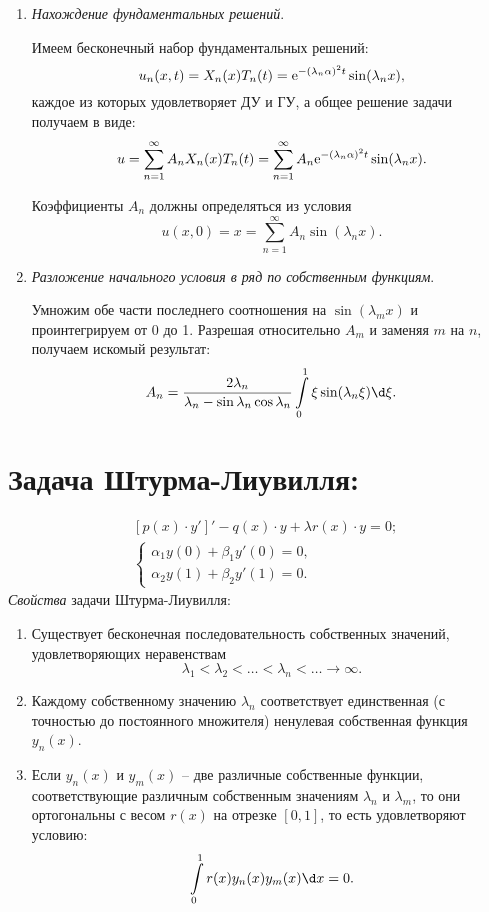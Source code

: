 \begin{enumerate}
    \item \emph{Нахождение фундаментальных решений}.
    
    Имеем бесконечный набор фундаментальных решений:
    \[
        u_n(x, t) = X_n(x)T_n(t) = \mathrm{e}^{-(\lambda_n\alpha)^2t}\sin(\lambda_nx),
    \]
    каждое из которых удовлетворяет ДУ и ГУ, а общее решение задачи получаем в
    виде:
    \[
        u = \sum\limits_{n=1}^\infty A_nX_n(x)T_n(t) = \sum\limits_{n=1}^\infty
        A_n\mathrm{e}^{-(\lambda_n\alpha)^2t}\sin(\lambda_nx).
    \]
    
    Коэффициенты \( A_n \) должны определяться из условия
    \[
        u(x, 0) = x = \sum\limits_{n=1}^\infty A_n\sin(\lambda_nx).
    \]
    
    \item \emph{Разложение начального условия в ряд по собственным функциям}.
    
    Умножим обе части последнего соотношения на \( \sin(\lambda_mx) \) и
    проинтегрируем от 0 до 1. Разрешая относительно \( A_m \) и заменяя \( m \)
    на \( n \), получаем искомый результат:
    \[
        A_n = \frac{2\lambda_n}{\lambda_n - \sin\lambda_n\cos\lambda_n}
        \int\limits_0^1 \xi\sin(\lambda_n\xi)\d\xi.
    \]
\end{enumerate}

\section{Задача Штурма-Лиувилля:}
\begin{multicols}{2}
\vspace*{-4em}
\begin{align*}
    & [p(x)\cdot y']' - q(x)\cdot y + \lambda r(x)\cdot y = 0; \\
    & \left\{ \begin{array}{l}
        \alpha_1 y(0) + \beta_1 y'(0) = 0, \\
        \alpha_2 y(1) + \beta_2 y'(1) = 0.
    \end{array} \right.
\end{align*}
\emph{Свойства} задачи Штурма-Лиувилля:
\begin{enumerate}
    \item Существует бесконечная последовательность собственных значений,
    удовлетворяющих неравенствам
    \[
        \lambda_1 < \lambda_2 < \ldots < \lambda_n < \ldots \to \infty.
    \]
    \item Каждому собственному значению \( \lambda_n \) соответствует
    единственная (с точностью до постоянного множителя) ненулевая собственная
    функция \( y_n(x) \). 
    \item Если \( y_n(x) \) и \( y_m(x) \) -- две различные собственные функции,
    соответствующие различным собственным значениям \( \lambda_n \) и
    \( \lambda_m \), то они ортогональны с весом \( r(x) \) на отрезке
    \( [0, 1] \), то есть удовлетворяют условию:
    \[
        \int\limits_0^1 r(x)y_n(x)y_m(x)\d x = 0.
    \]
\end{enumerate}
\end{multicols}

\newpage
